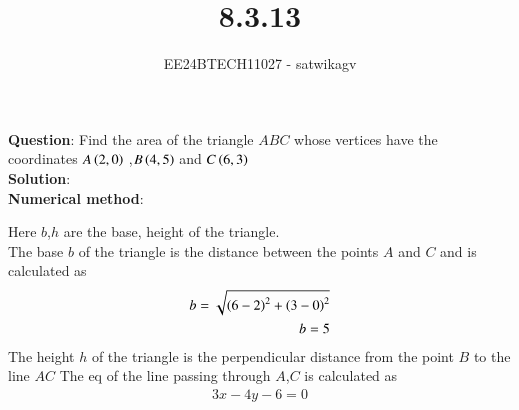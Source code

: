 \documentclass[journal]{IEEEtran}
\begin{document}

\vspace{3cm}

\title{8.3.13}
\author{EE24BTECH11027 - satwikagv}
{\let\newpage\relax\maketitle}

\renewcommand{\thefigure}{\theenumi}
\renewcommand{\thetable}{\theenumi}
\setlength{\intextsep}{10pt} %


\renewcommand{\thetable}{\theenumi}
\textbf{Question}:
Find the area of the triangle $ABC$  whose vertices have the coordinates $A\left(2,0\right)$ ,$B\left(4,5\right)$ and $C\left(6,3\right)$\\
\textbf{Solution}:\\
\textbf{Numerical method}:\\
\begin{center}
\end{center}
Here $b$,$h$ are the base, height of the triangle.\\
The base $b$ of the triangle is the distance between the points $A$ and $C$ and is calculated as 
\begin{align}
    b=\sqrt{\left(6-2\right)^2+\left(3-0\right)^2}\\
    b=5
\end{align}
The height $h$ of the triangle is the perpendicular distance from the point $B$ to the line $AC$
The eq of the line passing through $A$,$C$ is calculated as 
\begin{align}
    3x-4y-6=0
\end{align}
\end{document}
